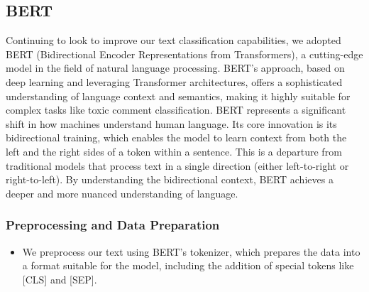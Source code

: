 \subsection{BERT}

Continuing to look to improve our text classification capabilities, we adopted BERT (Bidirectional Encoder Representations from Transformers), a cutting-edge model in the field of natural language processing. BERT's approach, based on deep learning and leveraging Transformer architectures, offers a sophisticated understanding of language context and semantics, making it highly suitable for complex tasks like toxic comment classification. BERT represents a significant shift in how machines understand human language. Its core innovation is its bidirectional training, which enables the model to learn context from both the left and the right sides of a token within a sentence. This is a departure from traditional models that process text in a single direction (either left-to-right or right-to-left). By understanding the bidirectional context, BERT achieves a deeper and more nuanced understanding of language.


\subsubsection{Preprocessing and Data Preparation}
\begin{itemize}
    \item We preprocess our text using BERT’s tokenizer, which prepares the data into a format suitable for the model, including the addition of special tokens like [CLS] and [SEP].
\end{itemize}

